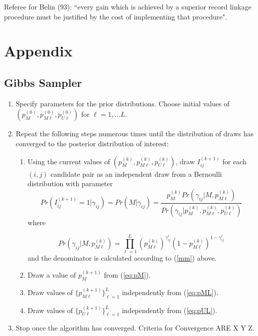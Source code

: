 \documentclass[11pt,reqno]{amsart}
\begin{document}
Referee for Belin (93): ``every gain which is achieved by a superior record linkage procedure must be justified by the cost of implementing that procedure". 



\newpage




\newpage
\appendix
\section{Appendix}

\subsection{Gibbs Sampler \citep{larsen_2005}}
\label{app:simple_gibbs}
\begin{enumerate}
\item Specify parameters for the prior distributions.  Choose initial values of $\left(p_M^{(0)}, p_{M\ell}^{(0)}, p_{U\ell}^{(0)}\right)$ for $\ell=1,\dots L$.  

\item Repeat the following steps numerous times until the distribution of draws has converged to the posterior distribution of interest:
\begin{enumerate}

\item Using the current values of $\left(p_M^{(k)}, p_{M\ell}^{(k)}, p_{U\ell}^{(k)}\right)$, draw $I_{ij}^{(k+1)}$ for each $(i,j)$ candidate pair as an independent draw from a Bernoulli distribution with parameter
\begin{equation}
Pr\left( I_{ij}^{(k+1)}=1 \Big| \gamma_{ij}\right) = Pr\left(M | \gamma_{ij}\right) = \frac{p_M^{(k)}Pr\left(\gamma_{ij} | M, p_{M\ell}^{(k)} \right)}{Pr\left(\gamma_{ij} \Big | p_M^{(k)}, p_{M\ell}^{(k)}, p_{U\ell}^{(k)}\right)}
\end{equation} where 

$$ Pr\left(\gamma_{ij} | M, p_{M\ell}^{(k)} \right) = \prod_{\ell=1}^L  \left(p_{M\ell}^{(k)}\right)^{\gamma_{ij}^{\ell}}\left(1-p_{M\ell}^{(k)}\right)^{1-\gamma_{ij}^{\ell}}$$ and the denominator is calculated according to (\ref{mm}) above. 
\item Draw a value of $p_M^{(k+1)}$ from (\ref{eq:pM}).
\item Draw values of $\{p_{M\ell}^{(k+1)}\}_{\ell=1}^L$ independently from (\ref{eq:pML}). 
\item Draw values of $\{p_{U\ell}^{(k+1)}\}_{\ell=1}^L$ independently from (\ref{eq:pUL}). 
\end{enumerate}
\item Stop once the algorithm has converged.  Criteria for Convergence ARE X Y Z. %
\end{enumerate}
\end{document}
